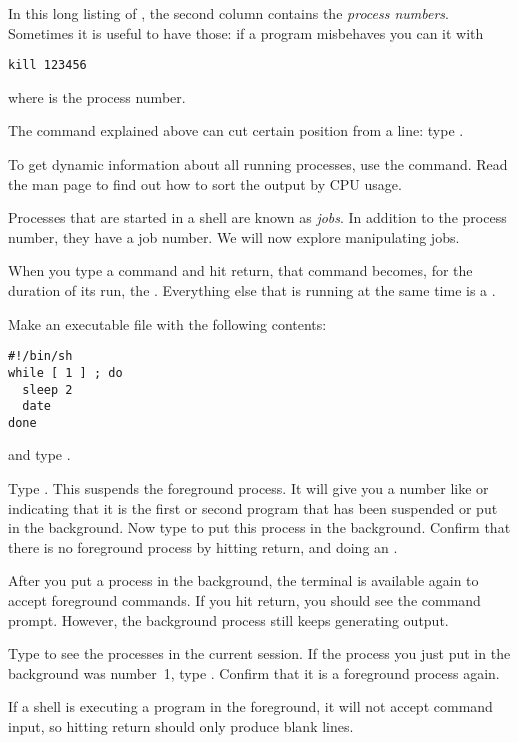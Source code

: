 In this long listing of , the second column contains the
\emph{process numbers}.
Sometimes it is useful to have those: if a program misbehaves you can
 it with
\begin{verbatim}
kill 123456
\end{verbatim}
where  is the process number.

The  command
explained above can
cut certain position from a line: type .

To get dynamic information about all running processes, use the
 command. Read the man page to find out how to sort the output
by CPU usage.

Processes that are started in a shell are known as
\emph{jobs}.
In addition to the process number, they have a job number.
We will now explore manipulating jobs.

When you type a command and hit return, that command becomes, for
the duration of its run, the . Everything else that is running at the same time is a
.

Make an executable file  with the following contents:
\begin{verbatim}
#!/bin/sh
while [ 1 ] ; do
  sleep 2
  date
done
\end{verbatim}
and type . 

\begin{exercise}
  Type . This suspends the foreground process. It will
  give you a number like \n{[1]} or \n{[2]} indicating that it is the
  first or second program that has been suspended or put in the
  background. Now type  to put this process in the
  background. Confirm that there is no foreground process by hitting
  return, and doing an .
\end{exercise}
\begin{outcome}
  After you put a process in the background, the terminal is available
  again to accept foreground commands. If you hit return, you should
  see the command prompt. However, the background process still keeps
  generating output.
\end{outcome}

\begin{exercise}
  Type  to see the processes in the current session. If the
  process you just put in the background was number~1,
  type . Confirm that it is a foreground process again.
\end{exercise}
\begin{outcome}
  If a shell is executing a program in the foreground, it will not
  accept command input, so hitting return should only produce blank
  lines.
\end{outcome}

